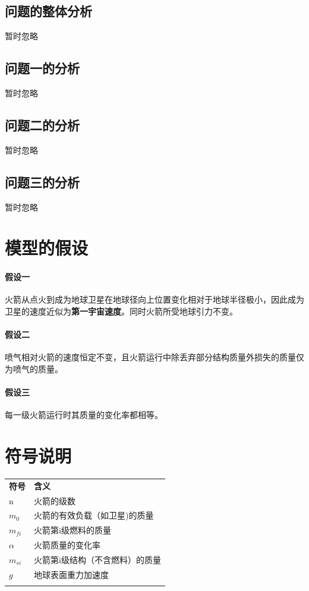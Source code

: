 \documentclass{JXUSTmodeling}
\begin{document}
\subsection{问题的整体分析}\label{sub:2.1}
暂时忽略
\subsection{问题一的分析}\label{sub:2.2}
暂时忽略
\subsection{问题二的分析}\label{sub:2.3}
暂时忽略
\subsection{问题三的分析}\label{sub:2.4}
暂时忽略
\section{模型的假设}\label{sec:3}
\paragraph{假设一}火箭从点火到成为地球卫星在地球径向上位置变化相对于地球半径极小，因此成为卫星的速度近似为{\bfseries 第一宇宙速度}。同时火箭所受地球引力不变。\cite{ref1}
\paragraph{假设二}喷气相对火箭的速度恒定不变，且火箭运行中除丢弃部分结构质量外损失的质量仅为喷气的质量。
\paragraph{假设三}每一级火箭运行时其质量的变化率都相等。
\section{符号说明}\label{sec:4}
\begin{table}[htbp]
    \centering
    \begin{tabularx}{\textwidth}{Y|Y}
    \Xhline{0.08em}
      {\bfseries 符号} & {\bfseries 含义}\\
      \Xhline{0.05em}
      n & 火箭的级数\\
      \Xhline{0.05em}
      $m_0$ & 火箭的有效负载（如卫星)的质量\\
      \Xhline{0.05em}
      $m_{fi}$ & 火箭第i级燃料的质量\\
      \Xhline{0.05em}
      $\alpha$ & 火箭质量的变化率\\
      \Xhline{0.05em}
      $m_{si}$ & 火箭第i级结构（不含燃料）的质量\\
      \Xhline{0.05em}
      $g$ & 地球表面重力加速度\\
      \Xhline{0.08em}
    \end{tabularx}
  \end{table}
\end{document}
